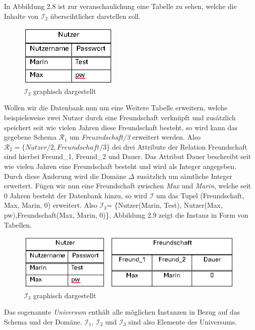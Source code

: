 In Abbildung 2.8 ist zur veranschaulichung eine Tabelle zu sehen, welche die Inhalte von $\mathcal{I}_2$ überscihtlicher darstellen soll.\\
\begin{figure}
\centering
\includegraphics[scale=1]{Figures/Tabelle1}
\decoRule
\caption[Tabelle1]{$\mathcal{I}_2$ graphisch dargestellt}
\label{fig:Task}
\end{figure}Wollen wir die Datenbank nun um eine Weitere Tabelle erweitern, welche beispielsweise zwei Nutzer durch eine Freundschaft verknüpft und zusätzlich speichert seit wie vielen Jahren diese Freundschaft besteht, so wird kann das gegebene Schema $\mathcal{R}_1$ um \textit{Freuzndschaft/3} erweitert werden. Also $\mathcal{R}_2=\{Nutzer/2, Freundschaft/3\}$ dei drei Attribute der Relation Freundschaft sind hierbei Freund\_1, Freund\_2 und Dauer. Das Attribut Dauer beschreibt seit wie vielen Jahren eine Freundschaft besteht und wird als Integer angegeben. Durch diese Änderung wird die Domäne ${\Delta}$ zusätzlich um sämtliche Integer erweitert. 
Fügen wir nun eine Freundschaft zwischen \textit{Max} und \textit{Marin}, welche seit 0 Jahren besteht der Datenbank hinzu, so wird  $\mathcal{I}$ um das Tupel (Freundschaft, Max, Marin, 0) erweitert. Also $\mathcal{I}_3$= \{Nutzer(Marin, Test), Nutzer(Max, pw),Freundschaft(Max, Marin, 0)\}. Abbildung 2.9 zeigt die Instanz in Form von Tabellen.\\
\begin{figure}
\centering
\includegraphics[scale=1]{Figures/Tabelle2}
\decoRule
\caption[Tabelle2]{$\mathcal{I}_3$ graphisch dargestellt}
\label{fig:Task}
\end{figure}Das sogenannte  \textit{Universum} enthält alle möglichen Instanzen in Bezug auf das Schema und der Domäne. $\mathcal{I}_1$, $\mathcal{I}_2$ und $\mathcal{I}_3$ sind also Elemente des Universums.\\
